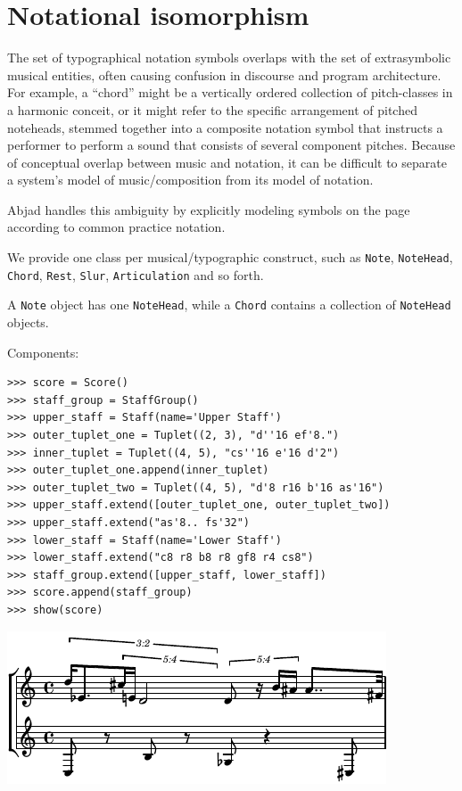 \section{Notational isomorphism}\label{sec:notational_isomorphism}

The set of typographical notation symbols overlaps with the set of
extrasymbolic musical entities, often causing confusion in discourse and
program architecture. For example, a “chord” might be a vertically ordered
collection of pitch-classes in a harmonic conceit, or it might refer to the
specific arrangement of pitched noteheads, stemmed together into a composite
notation symbol that instructs a performer to perform a sound that consists of
several component pitches. Because of conceptual overlap between music and
notation, it can be difficult to separate a system’s model of music/composition
from its model of notation.

Abjad handles this ambiguity by explicitly modeling symbols on the page
according to common practice notation.

We provide one class per musical/typographic construct, such as \texttt{Note},
\texttt{NoteHead}, \texttt{Chord}, \texttt{Rest}, \texttt{Slur},
\texttt{Articulation} and so forth.

A \texttt{Note} object has one \texttt{NoteHead}, while a \texttt{Chord}
contains a collection of \texttt{NoteHead} objects.

Components:

\begin{lstlisting}
>>> score = Score()
>>> staff_group = StaffGroup()
>>> upper_staff = Staff(name='Upper Staff')
>>> outer_tuplet_one = Tuplet((2, 3), "d''16 ef'8.")
>>> inner_tuplet = Tuplet((4, 5), "cs''16 e'16 d'2")
>>> outer_tuplet_one.append(inner_tuplet)
>>> outer_tuplet_two = Tuplet((4, 5), "d'8 r16 b'16 as'16")
>>> upper_staff.extend([outer_tuplet_one, outer_tuplet_two])
>>> upper_staff.extend("as'8.. fs'32")
>>> lower_staff = Staff(name='Lower Staff')
>>> lower_staff.extend("c8 r8 b8 r8 gf8 r4 cs8")
>>> staff_group.extend([upper_staff, lower_staff])
>>> score.append(staff_group)
>>> show(score)
\end{lstlisting}

\includegraphics[scale=1.0]{images/notational_isomorphism-1.pdf}


